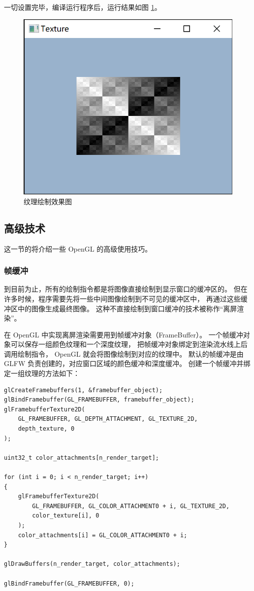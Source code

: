 \documentclass[fontset=windows]{ctexart}
\begin{document}
一切设置完毕，编译运行程序后，运行结果如图 \ref{fig-gl:texture-rendered}。

\begin{figure}[htbp]
\centering
\includegraphics[width=0.5\linewidth]{imgs/sec 5.2/texture.png}
\caption{纹理绘制效果图}
\label{fig-gl:texture-rendered}
\end{figure}

\subsection{高级技术}

这一节的将介绍一些 OpenGL 的高级使用技巧。

\subsubsection{帧缓冲}

到目前为止，所有的绘制指令都是将图像直接绘制到显示窗口的缓冲区的。
但在许多时候，程序需要先将一些中间图像绘制到不可见的缓冲区中，
再通过这些缓冲区中的图像生成最终图像。
这种不直接绘制到窗口缓冲的技术被称作“离屏渲染”。

在 OpenGL 中实现离屏渲染需要用到帧缓冲对象（FrameBuffer）。
一个帧缓冲对象可以保存一组颜色纹理和一个深度纹理，
把帧缓冲对象绑定到渲染流水线上后调用绘制指令，
OpenGL 就会将图像绘制到对应的纹理中。
默认的帧缓冲是由 GLFW 负责创建的，对应窗口区域的颜色缓冲和深度缓冲。
创建一个帧缓冲并绑定一组纹理的方法如下：

\begin{lstlisting}
glCreateFramebuffers(1, &framebuffer_object);
glBindFramebuffer(GL_FRAMEBUFFER, framebuffer_object);
glFramebufferTexture2D(
    GL_FRAMEBUFFER, GL_DEPTH_ATTACHMENT, GL_TEXTURE_2D, 
    depth_texture, 0
);

uint32_t color_attachments[n_render_target];

for (int i = 0; i < n_render_target; i++)
{
    glFramebufferTexture2D(
        GL_FRAMEBUFFER, GL_COLOR_ATTACHMENT0 + i, GL_TEXTURE_2D,
        color_texture[i], 0
    );
    color_attachments[i] = GL_COLOR_ATTACHMENT0 + i;
}

glDrawBuffers(n_render_target, color_attachments);

glBindFramebuffer(GL_FRAMEBUFFER, 0);
\end{lstlisting}
\end{document}
